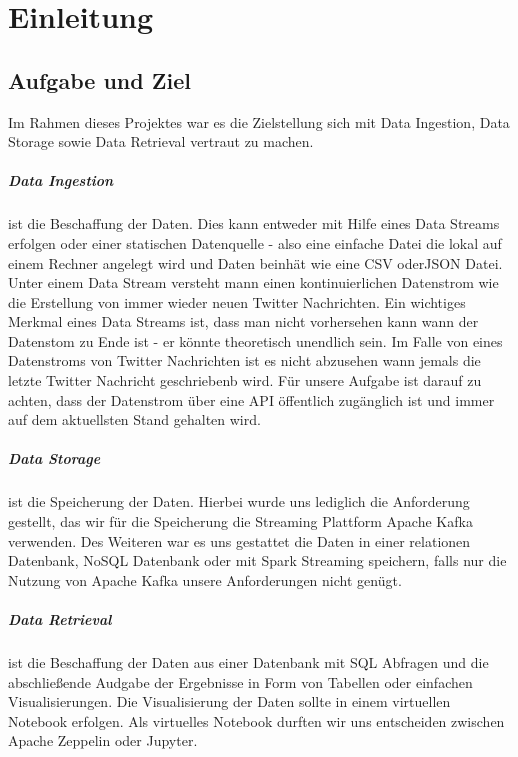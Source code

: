 \chapter{Einleitung}
\label{chap:einleitung}

\section{Aufgabe und Ziel}
Im Rahmen dieses Projektes war es die Zielstellung sich mit Data Ingestion, Data Storage sowie Data Retrieval vertraut zu machen.
\paragraph{Data Ingestion} ist die Beschaffung der Daten.
Dies kann entweder mit Hilfe eines Data Streams erfolgen oder einer statischen Datenquelle - also eine einfache Datei die lokal
auf einem Rechner angelegt wird und Daten beinhät wie \zb{} eine \ac{CSV} oder\ac{JSON} Datei.
Unter einem Data Stream versteht mann einen kontinuierlichen Datenstrom wie \zb{}
die Erstellung von immer wieder neuen Twitter Nachrichten.
Ein wichtiges Merkmal eines Data Streams ist, dass man nicht vorhersehen kann wann der Datenstom zu Ende ist - er könnte theoretisch unendlich sein.
Im Falle von eines Datenstroms von Twitter Nachrichten ist es nicht abzusehen wann jemals die letzte Twitter Nachricht geschriebenb wird.
Für unsere Aufgabe ist darauf zu achten, dass der Datenstrom über eine API öffentlich zugänglich ist und immer auf dem aktuellsten Stand gehalten wird.
\paragraph{Data Storage} ist die Speicherung der Daten.
Hierbei wurde uns lediglich die Anforderung gestellt, das wir für die Speicherung die Streaming Plattform Apache Kafka verwenden.
Des Weiteren war es uns gestattet die Daten in einer relationen Datenbank, NoSQL Datenbank oder mit Spark Streaming speichern,
falls nur die Nutzung von Apache Kafka unsere Anforderungen nicht genügt.
\paragraph{Data Retrieval} ist die Beschaffung der Daten aus einer Datenbank mit SQL Abfragen und die abschließende Audgabe
der Ergebnisse in Form von Tabellen oder einfachen Visualisierungen.
Die Visualisierung der Daten sollte in einem virtuellen Notebook erfolgen.
Als virtuelles Notebook durften wir uns entscheiden zwischen Apache Zeppelin oder Jupyter.

